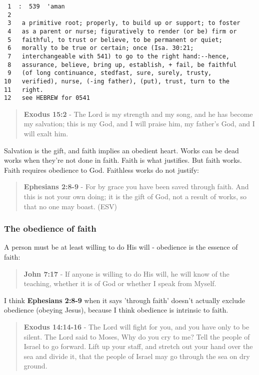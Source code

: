 \documentclass[11pt]{article}
\begin{document}
\begin{verbatim}
 1  :  539  'aman
 2  
 3   a primitive root; properly, to build up or support; to foster
 4   as a parent or nurse; figuratively to render (or be) firm or
 5   faithful, to trust or believe, to be permanent or quiet;
 6   morally to be true or certain; once (Isa. 30:21;
 7   interchangeable with 541) to go to the right hand:--hence,
 8   assurance, believe, bring up, establish, + fail, be faithful
 9   (of long continuance, stedfast, sure, surely, trusty,
10   verified), nurse, (-ing father), (put), trust, turn to the
11   right.
12   see HEBREW for 0541
\end{verbatim}

\begin{quote}
\textbf{Exodus 15:2} - The Lord is my strength and my song, and he has become my salvation; this is my God, and I will praise him, my father's God, and I will exalt him.
\end{quote}

Salvation is the gift, and faith implies an obedient heart. Works can be dead works when they're not done in faith. Faith is what justifies. But faith works. Faith requires obedience to God. Faithless works do not justify:

\begin{quote}
\textbf{Ephesians 2:8-9} - For by grace you have been saved through faith. And this is not your own doing; it is the gift of God, not a result of works, so that no one may boast. (ESV)
\end{quote}

\subsubsection{The obedience of faith}
\label{sec:org1b4ea47}

A person must be at least willing to do His will - obedience is the essence of faith:

\begin{quote}
\textbf{John 7:17} - If anyone is willing to do His will, he will know of the teaching, whether it is of God or whether I speak from Myself.
\end{quote}

I think \textbf{Ephesians 2:8-9} when it says 'through faith' doesn't actually exclude obedience (obeying Jesus), because I think obedience is intrinsic to faith.

\begin{quote}
\textbf{Exodus 14:14-16} - The Lord will fight for you, and you have only to be silent.  The Lord said to Moses, Why do you cry to me? Tell the people of Israel to go forward.  Lift up your staff, and stretch out your hand over the sea and divide it, that the people of Israel may go through the sea on dry ground.
\end{quote}
\end{document}

